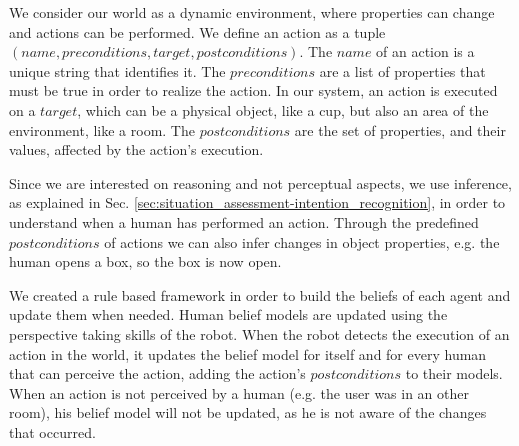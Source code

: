 We consider our world as a dynamic environment, where properties can change and actions can be performed.  We define an action as a tuple $(name, preconditions, target, postconditions)$. The $name$ of an action is a unique string that identifies it. The $preconditions$ are a list of properties that must be true in order to realize the action. In our system, an action is executed on a $target$, which can be a physical object, like a cup, but also an area of the environment, like a room. The $postconditions$ are the set of properties, and their values, affected by the action's execution.

Since we are interested on reasoning and not perceptual aspects, we use inference, as explained in Sec. \ref{sec:situation_assessment-intention_recognition}, in order to understand when a human has performed an action. Through the predefined $postconditions$ of actions we can also infer changes in object properties, e.g. the human opens a box, so the box is now open. 

We created a rule based framework in order to build the beliefs of each agent and update them when needed. Human belief models are updated using the perspective taking skills of the robot. When the robot detects the execution of an action in the world, it updates the belief model for itself and for every human that can perceive the action, adding the action's $postconditions$ to their models. When an action is not perceived by a human (e.g. the user was in an other room), his belief model will not be updated, as he is not aware of the changes that occurred.

